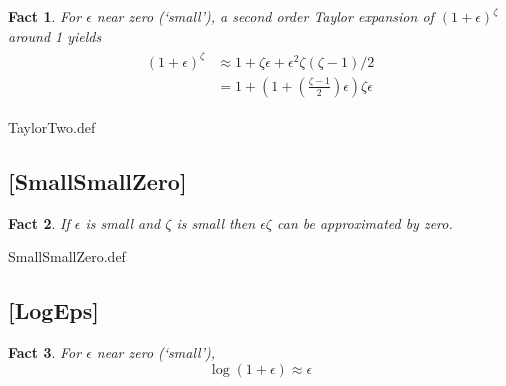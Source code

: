 \documentclass{handout}
\newtheorem{Fact}{Fact}
\begin{document}
\begin{Fact} For $\epsilon$ near zero (`small'), a second order Taylor expansion
of $(1+\epsilon)^{\zeta}$ around 1 yields
\begin{equation}\begin{gathered}\begin{aligned}
 (1+\epsilon)^{\zeta} & \approx  1+ \zeta \epsilon  + \epsilon^{2} \zeta (\zeta-1)/2 
\\ & =  1 + \left(1 + \left(\frac{\zeta - 1}{2}\right)\epsilon\right)\zeta \epsilon 
\end{aligned}\end{gathered}\end{equation}
\end{Fact}

\begin{verbatimwrite}{TaylorTwo.def}
\providecommand{\TaylorTwo}{\href{https://www.econ2.jhu.edu/people/ccarroll/public/LectureNotes/MathFacts/MathFactsList\#TaylorTwo}{\ensuremath{\mathtt{[TaylorTwo]}}}}
\end{verbatimwrite}


\hypertarget{SmallSmallZero}{}
\subsection{[SmallSmallZero]}\label{fact:SmallSmallZero}

\begin{Fact} If $\epsilon$ is small and $\zeta$ is small then $\epsilon\zeta$ can be 
approximated by zero.
\end{Fact}

\begin{verbatimwrite}{SmallSmallZero.def}
\providecommand{\SmallSmallZero}{\href{https://www.econ2.jhu.edu/people/ccarroll/public/LectureNotes/MathFacts/MathFactsList\#SmallSmallZero}{\ensuremath{\mathtt{[SmallSmallZero]}}}}
\end{verbatimwrite}



\hypertarget{LogEps}{}
\subsection{[LogEps]}\label{fact:LogEps}

\begin{Fact} For $\epsilon$ near zero (`small'), 
\begin{equation}
\log (1+\epsilon) \approx \epsilon
\end{equation}
\end{Fact}
\end{document}
